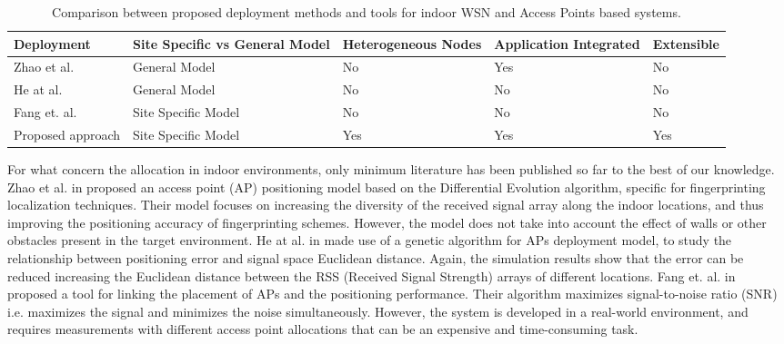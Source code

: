 \begin{table}
\centering
\def\arraystretch{1}
\label{tab:comparison}
\caption{Comparison between proposed deployment methods and tools for indoor WSN and Access Points based systems.}
\begin{tabulary}{\textwidth}{| L | L | L | L | L |}
    \hline
    \textbf{Deployment} & \textbf{Site Specific vs General Model} & \textbf{Heterogeneous Nodes} & \textbf{Application Integrated} & \textbf{Extensible} \\ \hline
    Zhao et al. \cite{Zhao2008} & General Model & No & Yes & No\\ \hline
    He at al. \cite{He2011} & General Model & No & No & No\\ \hline
    Fang et. al. \cite{Fang2010} & Site Specific Model & No & No & No\\ \hline
    Proposed approach & Site Specific Model & Yes & Yes & Yes\\ \hline

    \end{tabulary}
\end{table}

For what concern the allocation in indoor environments, only minimum literature has been published so far to the best of our knowledge. Zhao et al. in \cite{Zhao2008} proposed an access point (AP) positioning model based on the Differential Evolution algorithm, specific for fingerprinting localization techniques. Their model focuses on increasing the diversity of the received signal array along the indoor locations, and thus improving the positioning accuracy of fingerprinting schemes.
However, the model does not take into account the effect of walls or other obstacles present in the target environment.
He at al. in \cite{He2011} made use of a genetic algorithm for APs deployment model, to study the relationship between positioning error and signal space Euclidean distance. Again, the simulation results show that the error can be reduced increasing the Euclidean distance between the RSS (Received Signal Strength) arrays of different locations.
Fang et. al. in \cite{Fang2010} proposed a tool for linking the placement of APs and the positioning performance. Their algorithm maximizes signal-to-noise ratio (SNR) i.e. maximizes the signal and minimizes the noise simultaneously. However, the system is developed in a real-world environment, and requires measurements with different access point allocations that can be an expensive and time-consuming task.

